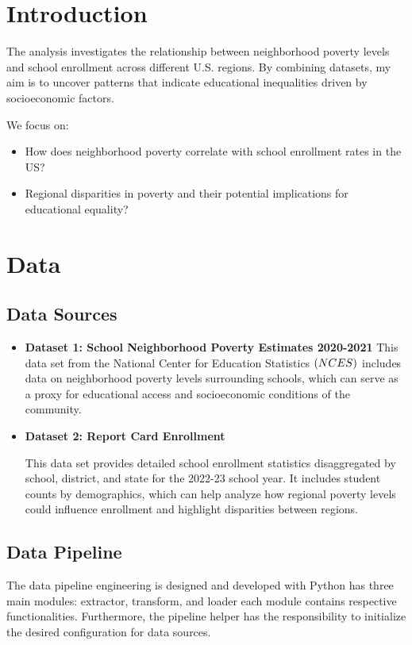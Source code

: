 \documentclass[a4paper,11pt]{article}
\begin{document}
\section{Introduction}
The analysis investigates the relationship between neighborhood poverty levels and school enrollment across different U.S. regions. By combining datasets, my aim is to uncover patterns that indicate educational inequalities driven by socioeconomic factors.

We focus on:
    \begin{itemize}
        \item How does neighborhood poverty correlate with school enrollment rates in the US?
    
        \item Regional disparities in poverty and their potential implications for educational equality?
    \end{itemize}

\section{Data}
    \subsection{Data Sources}
        \begin{itemize}
            \item \textbf{Dataset 1: School Neighborhood Poverty Estimates 2020-2021}
            This data set from the National Center for Education Statistics \(\text(NCES)\) includes data on neighborhood poverty levels surrounding schools, which can serve as a proxy for educational access and socioeconomic conditions of the community. \cite{dataset1}

            \item \textbf{Dataset 2: Report Card Enrollment}

            This data set provides detailed school enrollment statistics disaggregated by school, district, and state for the 2022-23 school year. It includes student counts by demographics, which can help analyze how regional poverty levels could influence enrollment and highlight disparities between regions. \cite{dataset2}
        \end{itemize}

    \subsection{Data Pipeline}
        The data pipeline engineering is designed and developed with Python has three main modules: extractor, transform, and loader each module contains respective functionalities. Furthermore, the pipeline helper has the responsibility to initialize the desired configuration for data sources.
\end{document}
